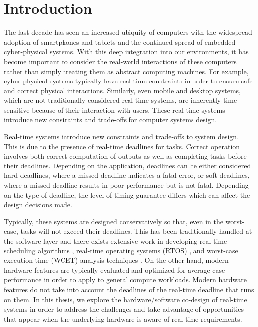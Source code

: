 \chapter{Introduction}
\label{chap:intro}

The last decade has seen an increased ubiquity of computers with the widespread
adoption of smartphones and tablets and the continued spread of embedded
cyber-physical systems. With this deep integration into our environments, it has
become important to consider the real-world interactions of these computers
rather than simply treating them as abstract computing machines. For example,
cyber-physical systems typically have real-time constraints in order to ensure
safe and correct physical interactions. Similarly, even mobile and desktop
systems, which are not traditionally considered real-time systems, are
inherently time-sensitive because of their interaction with users.
These real-time systems introduce new constraints and trade-offs for computer
systems design.

Real-time systems introduce new constraints and trade-offs to system design.
This is due to the presence of real-time deadlines for tasks.
Correct operation involves both correct computation of outputs as well as
completing tasks before their deadlines. Depending on the application,
deadlines can be either considered hard deadlines, where a missed deadline
indicates a fatal error, or soft deadlines, where a missed deadline results in
poor performance but is not fatal. Depending on the type of deadline, the level
of timing guarantee differs which can affect the design decisions made.

Typically, these systems are designed conservatively so that, even in the
worst-case, tasks will not exceed their deadlines.  This has been traditionally
handled at the software layer and there exists extensive work in developing real-time scheduling
algorithms \cite{rtschedulingsurvey-csur11}, real-time operating systems (RTOS)
\cite{rtossurvey-micro09, rtossurvey-icesc14}, and worst-case execution time
(WCET) analysis techniques \cite{wcetsurvey-tecs08}. On the other hand, modern hardware
features are typically evaluated and optimized for average-case performance in
order to apply to general compute workloads. Modern hardware features do not
take into account the deadlines of the real-time deadline that runs on them.
In this thesis, we explore the hardware/software co-design of real-time systems
in order to address the challenges and take advantage of opportunities that
appear when the underlying hardware is aware of real-time requirements.

